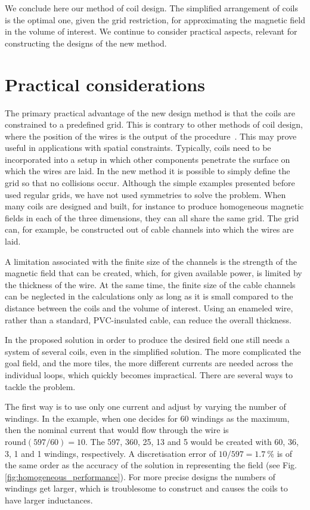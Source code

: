We conclude here our method of coil design. The simplified arrangement of coils is the optimal one, given the grid restriction, for approximating the magnetic field in the volume of interest. We continue to consider practical aspects, relevant for constructing the designs of the new method.




\section{Practical considerations}
The primary practical advantage of the new design method is that the coils are constrained to a predefined grid. This is contrary to other methods of coil design, where the position of the wires is the output of the procedure~\cite{Turner1993, Beidler1990}. This may prove useful in applications with spatial constraints. Typically, coils need to be incorporated into a setup in which other components penetrate the surface on which the wires are laid. In the new method it is possible to simply define the grid so that no collisions occur. Although the simple examples presented before used regular grids, we have not used symmetries to solve the problem. When many coils are designed and built, for instance to produce homogeneous magnetic fields in each of the three dimensions, they can all share the same grid. The grid can, for example, be constructed out of cable channels into which the wires are laid.

A limitation associated with the finite size of the channels is the strength of the magnetic field that can be created, which, for given available power, is limited by the thickness of the wire. At the same time, the finite size of the cable channels can be neglected in the calculations only as long as it is small compared to the distance between the coils and the volume of interest. Using an enameled wire, rather than a standard, PVC-insulated cable, can reduce the overall thickness.

In the proposed solution in order to produce the desired field one still needs a system of several coils, even in the simplified solution. The more complicated the goal field, and the more tiles, the more different currents are needed across the individual loops, which quickly becomes impractical. There are several ways to tackle the problem.

The first way is to use only one current and adjust by varying the number of windings. In the example, when one decides for \num{60} windings as the maximum, then the nominal current that would flow through the wire is $\mathrm{round}(597 / 60) = 10$. The \num{597}, \num{360}, \num{25}, \num{13} and \num{5} would be created with \num{60}, \num{36}, \num{3}, \num{1} and \num{1} windings, respectively. A discretisation error of $10 / 597 = \SI{1.7}{\percent}$ is of the same order as the accuracy of the solution in representing the field (see Fig.\,\ref{fig:homogeneous_performance}). For more precise designs the numbers of windings get larger, which is troublesome to construct and causes the coils to have larger inductances.

